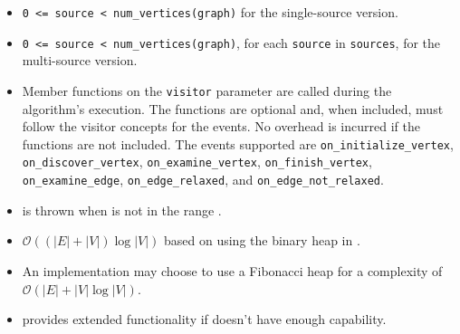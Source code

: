 \begin{itemdescr}
\preconditions
            \begin{itemize}
                  \item
                        \lstinline{0 <= source < num_vertices(graph)} for the single-source version.
                  \item
                        \lstinline{0 <= source < num_vertices(graph)}, for each \lstinline{source} in \lstinline{sources}, 
                                   for the multi-source version.
            \end{itemize}
      \pnum\effects
            \begin{itemize}
                  \item Member functions on the \lstinline{visitor} parameter are called during the algorithm's execution.
                        The functions are optional and, when included, must follow the visitor concepts for the events.
                        No overhead is incurred if the functions are not included.
                        The events supported are \lstinline{on_initialize_vertex}, \lstinline{on_discover_vertex},
                        \lstinline{on_examine_vertex}, \lstinline{on_finish_vertex}, \lstinline{on_examine_edge},
                        \lstinline{on_edge_relaxed}, and \lstinline{on_edge_not_relaxed}.
            \end{itemize}
      \pnum\throws
            \begin{itemize}
                  \item {} is thrown when  is not in the range .
            \end{itemize}
      \pnum\complexity
            \begin{itemize}
                  \item $\mathcal{O}((|E| + |V|)\log{|V|})$ based on using the binary heap in .
                  \item An implementation may choose to use a Fibonacci heap for a complexity of $\mathcal{O}(|E| + |V|\log{|V|})$.
            \end{itemize}
      \pnum\remarks 
            \begin{itemize}
                  \item {} provides extended functionality if  doesn't have
                         enough capability.
            \end{itemize}
\end{itemdescr}





